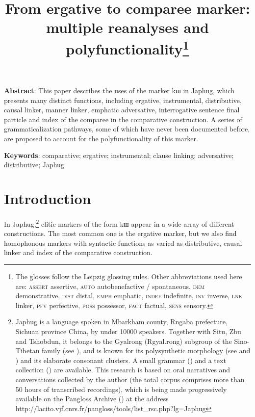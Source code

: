 \documentclass[oldfontcommands,oneside,a4paper,11pt]{article}
\newcommand{\ipa}[1]{{\phon #1}} %
\begin{document}
 

\title{From ergative to comparee marker: multiple reanalyses and polyfunctionality\footnote{The glosses follow the Leipzig glossing rules. Other abbreviations used here are:   \textsc{assert} assertive, \textsc{auto} autobenefactive / spontaneous,  \textsc{dem} demonstrative, \textsc{dist} distal, \textsc{emph} emphatic, \textsc{indef} indefinite, \textsc{inv} inverse,  \textsc{lnk} linker, \textsc{pfv} perfective, \textsc{poss} possessor, \textsc{fact} factual,  \textsc{sens} sensory.} }

\maketitle
   \sloppy
\textbf{Abstract}: This paper describes the uses of the marker  \ipa{kɯ} in Japhug, which presents many distinct functions, including ergative, instrumental, distributive, causal linker, manner linker, emphatic adversative, interrogative sentence final particle and index of the comparee in the comparative construction. A series of grammaticalization pathways, some of which have never been documented before, are proposed to account for the polyfunctionality of this marker.

\textbf{Keywords}: comparative; ergative; instrumental; clause linking; adversative; distributive; Japhug
  
\section{Introduction}
  
 
 
In Japhug,\footnote{Japhug is a language spoken in Mbarkham county, Rngaba prefecture, Sichuan province China, by under 10000 speakers. Together with Situ, Zbu and Tshobdun, it belongs to the Gyalrong (Rgyal.rong) subgroup of the Sino-Tibetan family (see \citealt{jackson00sidaba}), and is known for its polysynthetic morphology (see \citealt{jacques13harmonization} and  \citealt{jacques14antipassive}) and its elaborate consonant clusters. A small grammar  (\citealt{jacques08zh}) and a text collection (\citealt{jacques10gesar}) are available.  This research is based on oral narratives and conversations collected by the author (the total corpus comprises more than 50 hours of transcribed recordings), which is being made progressively available on the Pangloss Archive (\citealt{michailovsky14pangloss}) at the address http://lacito.vjf.cnrs.fr/pangloss/tools/list\_rsc.php?lg=Japhug } clitic markers of the form \ipa{kɯ} appear in a wide array of different constructions. The most common one is the ergative marker, but we also find homophonous markers with syntactic functions as varied as distributive, causal linker  and  index of the comparative construction. 
\end{document}
